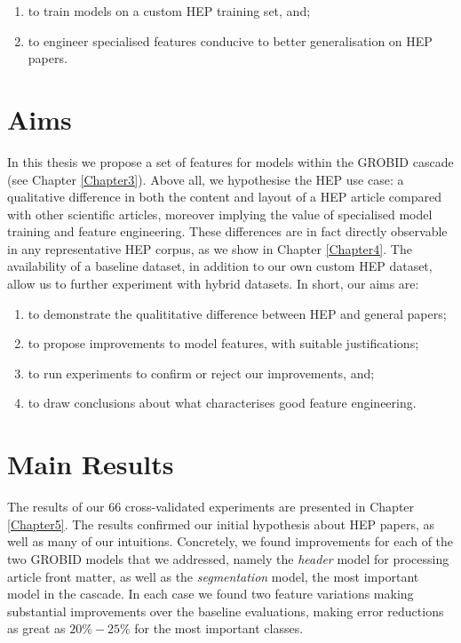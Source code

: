 \begin{enumerate}
\item to train models on a custom HEP training set, and;
\item to engineer specialised features conducive to better generalisation on HEP papers.
\end{enumerate}

\section{Aims}

In this thesis we propose a set of features for models within the GROBID cascade (see Chapter \ref{Chapter3}). Above all, we hypothesise the HEP use case: a qualitative difference in both the content and layout of a HEP article compared with other scientific articles, moreover implying the value of specialised model training and feature engineering. These differences are in fact directly observable in any representative HEP corpus, as we show in Chapter \ref{Chapter4}. The availability of a baseline dataset, in addition to our own custom HEP dataset, allow us to further experiment with hybrid datasets. In short, our aims are:

\begin{enumerate}
\item to demonstrate the qualititative difference between HEP and general papers;
\item to propose improvements to model features, with suitable justifications;
\item to run experiments to confirm or reject our improvements, and;
\item to draw conclusions about what characterises good feature engineering.
\end{enumerate}

\section{Main Results}

The results of our 66 cross-validated experiments are presented in Chapter \ref{Chapter5}. The results confirmed our initial hypothesis about HEP papers, as well as many of our intuitions. Concretely, we found improvements for each of the two GROBID models that we addressed, namely the \emph{header} model for processing article front matter, as well as the \emph{segmentation} model, the most important model in the cascade. In each case we found two feature variations making substantial improvements over the baseline evaluations, making error reductions as great as $20\%-25\%$ for the most important classes.

